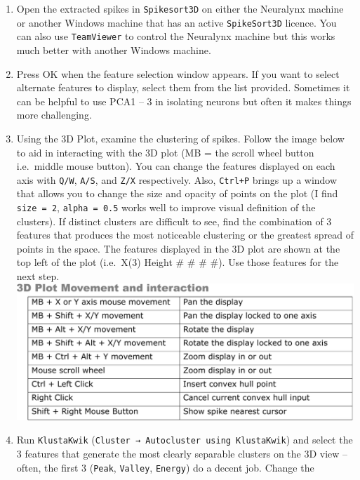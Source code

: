 \documentclass[
]{book}
\providecommand{\tightlist}{%
  \setlength{\itemsep}{0pt}\setlength{\parskip}{0pt}}
\begin{document}
\begin{enumerate}
  \begin{enumerate}
  \def\labelenumii{\arabic{enumii}.}
  \tightlist
  \item
    Open the extracted spikes in \texttt{Spikesort3D} on either the
    Neuralynx machine or another Windows machine that has an
    active \texttt{SpikeSort3D} licence. You can also use \texttt{TeamViewer} to
    control the Neuralynx machine but this works much better with
    another Windows machine.
  \item
    Press OK when the feature selection window appears. If you
    want to select alternate features to display, select them from
    the list provided. Sometimes it can be helpful to use PCA1 --
    3 in isolating neurons but often it makes things more
    challenging.
  \item
    Using the 3D Plot, examine the clustering of spikes. Follow
    the image below to aid in interacting with the 3D plot (MB =
    the scroll wheel button i.e.~middle mouse button). You can
    change the features displayed on each axis with \texttt{Q/W}, \texttt{A/S},
    and \texttt{Z/X} respectively. Also, \texttt{Ctrl+P} brings up a window that
    allows you to change the size and opacity of points on the
    plot (I find \texttt{size\ =\ 2}, \texttt{alpha\ =\ 0.5} works well to improve
    visual definition of the clusters). If distinct clusters are
    difficult to see, find the combination of 3 features that
    produces the most noticeable clustering or the greatest spread
    of points in the space. The features displayed in the 3D plot
    are shown at the top left of the plot (i.e.~X(3) Height \# \#
    \# \#). Use those features for the next step.
    \includegraphics{source_images/sec3.2.3_3d_plot_movement.png}
  \item
    Run \texttt{KlustaKwik} (\texttt{Cluster\ →\ Autocluster\ using\ KlustaKwik})
    and select the 3 features that generate the most clearly
    separable clusters on the 3D view -- often, the first 3
    (\texttt{Peak}, \texttt{Valley}, \texttt{Energy}) do a decent job. Change the

\end{enumerate}
\end{enumerate}
\end{document}
